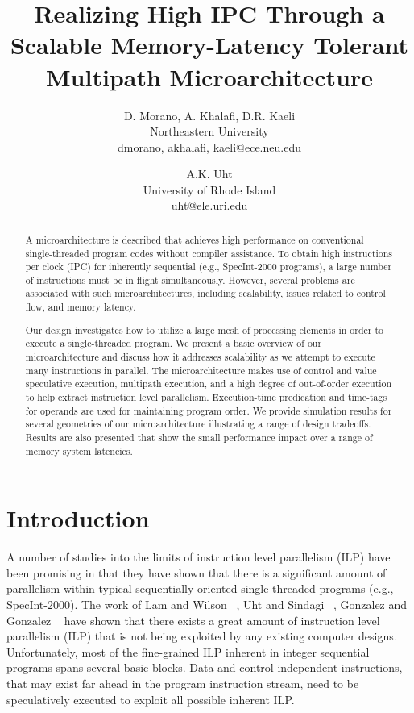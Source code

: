 \documentclass[10pt,twocolumn,dvips]{article}
\begin{document}
%
\title{Realizing High IPC Through a Scalable Memory-Latency Tolerant
Multipath Microarchitecture}
%
\author{
D. Morano, A. Khalafi, D.R. Kaeli\\
Northeastern University\\
{dmorano, akhalafi, kaeli}@ece.neu.edu\\
\and
A.K. Uht \\
University of Rhode Island\\ 
uht@ele.uri.edu
}
%
\date{}
%
\maketitle
%
%
\thispagestyle{empty}
%
%
\begin{abstract}
A microarchitecture is described that achieves high performance on
conventional single-threaded program codes without compiler
assistance.  To obtain high instructions per clock (IPC) for inherently
sequential (e.g., SpecInt-2000 programs), a large number of
instructions must be in flight simultaneously.  However, several
problems are associated with such microarchitectures, including
scalability, issues related to control flow, and memory latency.

Our design investigates how to utilize a large mesh of processing
elements in order to execute a single-threaded program.  
We present a basic overview of our microarchitecture and discuss how it
addresses scalability as we attempt to execute many instructions in
parallel.  
The microarchitecture makes use of control and value speculative
execution, multipath execution, and a high degree of out-of-order execution
to help extract instruction level parallelism.
Execution-time
predication and time-tags for operands 
are used for maintaining program order.
We provide
simulation results for several geometries of our microarchitecture
illustrating a range of design tradeoffs.  
Results are also presented that show the small performance
impact over a range of memory system latencies.
\end{abstract}
%
%
\section{Introduction}
%
A number of studies into the limits of instruction level 
parallelism (ILP) have
been promising in that they have shown that there is 
a significant amount of parallelism within
typical sequentially oriented single-threaded programs
(e.g., SpecInt-2000).  
The work of 
Lam and Wilson ~\cite{Lam92},
Uht and Sindagi ~\cite{Uht95},
Gonzalez and Gonzalez ~\cite{Gon97}
have shown that there exists a great amount of instruction level
parallelism (ILP) that is not being exploited by any existing
computer designs.
Unfortunately, most of the fine-grained ILP
inherent in integer sequential programs
spans several basic blocks.  
Data and control independent instructions, that may exist
far ahead in the program instruction stream, need to be
speculatively executed to exploit all possible inherent ILP.
\end{document}
